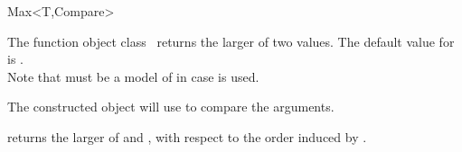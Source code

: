\begin{ccRefFunctionObjectClass}{Max<T,Compare>}

\ccDefinition

The function object class \ccRefName\ returns the larger of two values.
The default value for  is .\\

Note that  must be a model of 
in case  is used. 
 

\ccIsModel
{}

\ccCreation
{}
\ccGlue
{}
        {The constructed object will use  to compare the arguments. }

\ccOperations
{}
{returns the larger of  and , 
with respect to the order induced by . }

\end{ccRefFunctionObjectClass}
